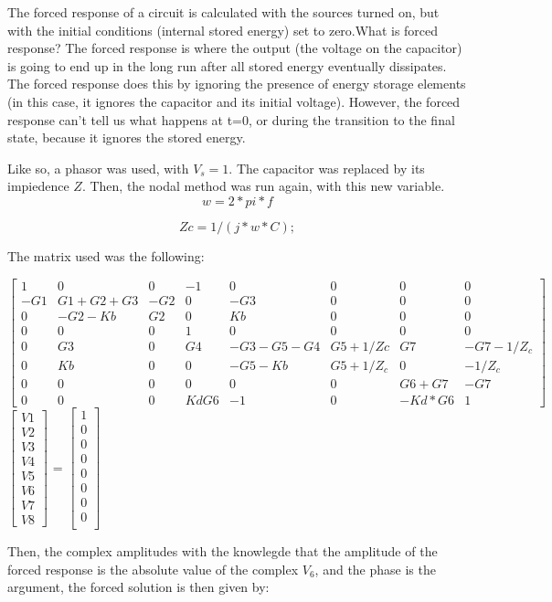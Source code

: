The forced response of a circuit is calculated with the sources turned on, but with the initial conditions (internal stored energy) set to zero.What is forced response? The forced response is where the output (the voltage on the capacitor) is going to end up in the long run after all stored energy eventually dissipates. The forced response does this by ignoring the presence of energy storage elements (in this case, it ignores the capacitor and its initial voltage). However, the forced response can't tell us what happens at t=0, or during the transition to the final state, because it ignores the stored energy. 
\par Like so, a phasor was used, with $V_{s}=1$. The capacitor was replaced by its impiedence $Z$. Then, the nodal method was run again, with this new variable.
\begin{equation}
w=2*pi*f
\end{equation} 

\begin{equation}
Zc=1/(j*w*C);
\end{equation} 

\par The matrix used was the following:

$\begin{bmatrix}
1 & 0 & 0 & -1 & 0 & 0 & 0 & 0 \\
-G1 & G1+G2+G3 & -G2 & 0 & -G3 & 0 & 0 & 0 \\
0 & -G2-Kb & G2 & 0 & Kb & 0 & 0 & 0 \\
0 & 0 & 0 & 1 & 0 & 0 & 0 & 0 \\
0 & G3 & 0 & G4 &-G3-G5-G4 & G5+1/Zc & G7 & -G7-1/Z_{c}\\
0 & Kb & 0 & 0 & -G5-Kb & G5+1/Z_{c} & 0 & -1/Z_{c} \\
0 & 0 & 0 & 0 & 0 & 0 & G6+G7& -G7 \\
0 & 0 & 0 & KdG6 & -1 & 0 & -Kd*G6 & 1
\end{bmatrix}$
$\begin{bmatrix}
V1 \\ V2 \\ V3 \\ V4 \\ V5 \\ V6 \\ V7 \\ V8
\end{bmatrix}$
= 
$\begin{bmatrix}
1 \\ 0 \\ 0 \\ 0 \\ 0 \\ 0 \\ 0 \\ 0 \\ 
\end{bmatrix}$
\par Then, the complex amplitudes with the knowlegde that the amplitude of the forced response is the absolute value of the complex $V_{6}$, and the phase is the argument, the forced solution is then given by:

